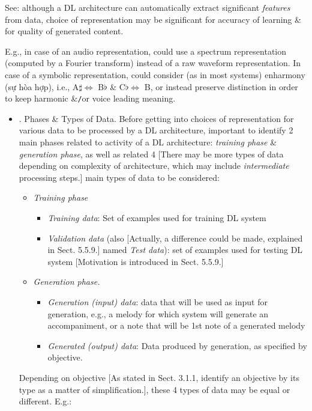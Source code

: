\documentclass{article}
\begin{document}
\begin{itemize}
	See: although a DL architecture can automatically extract significant {\it features} from data, choice of representation may be significant for accuracy of learning \& for quality of generated content.
	
	E.g., in case of an audio representation, could use a spectrum representation (computed by a Fourier transform) instead of a raw waveform representation. In case of a symbolic representation, could consider (as in most systems) enharmony (sự hòa hợp), i.e., A$\sharp\Leftrightarrow$ B$\flat$ \& C$\flat\Leftrightarrow$ B, or instead preserve distinction in order to keep harmonic \&{\tt/}or voice leading meaning.
	\begin{itemize}
		\item {. Phases \& Types of Data.} Before getting into choices of representation for various data to be processed by a DL architecture, important to identify 2 main phases related to activity of a DL architecture: {\it training phase} \& {\it generation phase}, as well as related 4 [There may be more types of data depending on complexity of architecture, which may include {\it intermediate} processing steps.] main types of data to be considered:
		\begin{itemize}
			\item {\it Training phase}
			\begin{itemize}
				\item {\it Training data}: Set of examples used for training DL system
				\item {\it Validation data} (also [Actually, a difference could be made, explained in Sect. 5.5.9.] named {\it Test data}): set of examples used for testing DL system [Motivation is introduced in Sect. 5.5.9.]
			\end{itemize}
			\item {\it Generation phase.}
			\begin{itemize}
				\item {\it Generation (input) data}: data that will be used as input for generation, e.g., a melody for which system will generate an accompaniment, or a note that will be 1st note of a generated melody
				\item {\it Generated (output) data}: Data produced by generation, as specified by objective.
			\end{itemize}
		\end{itemize}
		Depending on objective [As stated in Sect. 3.1.1, identify an objective by its type as a matter of simplification.], these 4 types of data may be equal or different. E.g.:

\end{itemize}
\end{itemize}
\end{document}
